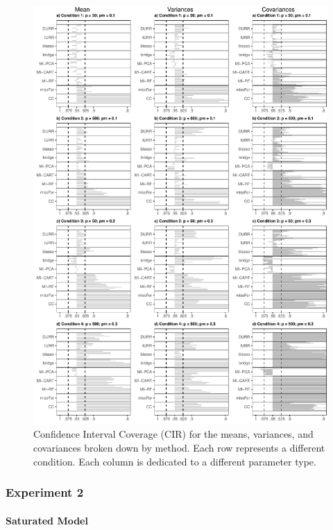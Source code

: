 \begin{figure}
	\includegraphics[width=\textwidth]{../../output/graphs/exp1_CI.pdf}
\caption{Confidence Interval Coverage (CIR) for the means, variances, and covariances broken 
	down by method. 
	Each row represents a different condition. 
	Each column is dedicated to a different parameter type.}
\label{fig:exp1cir}
\end{figure}
	
\FloatBarrier %

\subsubsection{Experiment 2}

\paragraph{Saturated Model}

